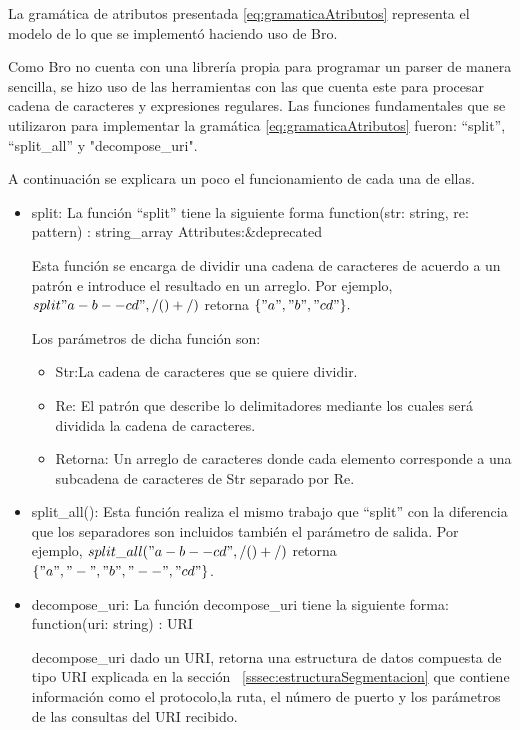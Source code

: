     La gramática de atributos presentada \ref{eq:gramaticaAtributos} representa el modelo de lo que se implementó haciendo uso de Bro.

    Como Bro no cuenta con una librería propia para programar un parser de manera sencilla, se hizo uso de las herramientas con las que cuenta este para procesar cadena de caracteres y expresiones regulares. Las funciones fundamentales que se utilizaron para implementar  la gramática \ref{eq:gramaticaAtributos} fueron: “split”, “split\_all” y "decompose\_uri".

A continuación se explicara un poco el funcionamiento de cada una de ellas.

\begin{itemize}
\item split:
La función “split” tiene la siguiente forma
function(str: string, re: pattern) : string\_array Attributes:\&deprecated

Esta función se encarga de dividir una cadena de caracteres de acuerdo a un patrón e introduce el resultado en un arreglo. Por ejemplo, $split"a-b--cd", /(\-)+/)$ retorna $\{"a", "b", "cd"\}.$

Los parámetros de dicha función son:

\begin{itemize}
\item Str:La cadena de caracteres que se quiere dividir. 
\item Re: El patrón que describe lo delimitadores mediante los cuales será dividida la cadena de caracteres. 
\item Retorna: Un arreglo de caracteres donde cada elemento corresponde a una subcadena de caracteres de Str separado por Re.
\end{itemize}

\item split\_all():
Esta función realiza el mismo trabajo que “split” con la diferencia que los separadores son incluidos también el parámetro de salida.  Por ejemplo, $split\_all("a-b--cd", /(\-)+/)$ retorna $\{"a", "-", "b", "--", "cd"\}$.

\item decompose\_uri:
La función decompose\_uri tiene la siguiente forma: function(uri: string) : URI

decompose\_uri dado un URI, retorna una estructura de datos compuesta de tipo URI explicada en la sección ~\ref{sssec:estructuraSegmentacion} que contiene información como el protocolo,la ruta, el número de puerto y los parámetros de las consultas del URI recibido.
\end{itemize}

